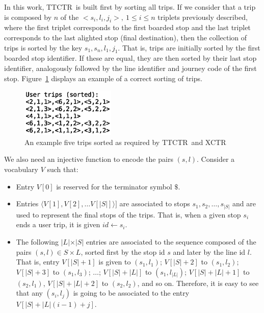 \documentclass[runningheads]{llncs}
\newcommand{\ctr}{XCTR}
\newcommand{\ttctr}{TTCTR}
\begin{document}
In this work, \ttctr~is built first by sorting all trips. If we consider that a trip is composed by $n$ of the $<s_i,l_i,j_i>,~1\leq i\leq n$ triplets previously described, where the first triplet corresponds to the first boarded stop and the last triplet corresponds to the last alighted stop (final destination), then the collection of trips is sorted by the key $s_1,s_n,l_1,j_1$. That is, trips are initially sorted by the first boarded stop identifier. If these are equal, they are then sorted by their last stop identifier, analogously followed by the line identifier and journey code of the first stop. Figure~\ref{fig:example_trips} displays an example of a correct sorting of trips.

\begin{figure}[hbt!]
\includegraphics[width=0.4\textwidth]{example_trips.eps}
\caption{An example five trips sorted as required by \ttctr~and \ctr}
\label{fig:example_trips}
\end{figure}

We also need an injective function to encode the pairs $(s,l)$. Consider a vocabulary $V$ such that:
\begin{itemize}
	\item Entry $V[0]$ is reserved for the terminator symbol $\$$.
	\item Entries $\langle V[1],V[2], \dots V[|S|]\rangle]$ are associated to stops $s_1,s_2,\dots, s_{|S|}$ and are used to represent the final stops of the trips. That is, when a given stop $s_i$ ends a user trip, it is given $id \leftarrow s_i$.
	\item The following $|L|$$\times$$|S|$ entries are associated to the sequence composed of the pairs $(s,l) \in S\times L$, sorted first by the stop id $s$ and later by the line id $l$. That is, entry $V[|S|+1]$ is given to $(s_1,l_1)$; $V[|S|+2]$ to $(s_1,l_2)$; $V[|S|+3]$ to $(s_1,l_3)$; $\dots$; $V[|S|+|L|]$ to $(s_1,l_{|L|})$;  $V[|S|+|L|+1]$ to $(s_2, l_1)$, $V[|S|+|L|+2]$ to $(s_2, l_2)$, and so on. Therefore, it is easy to see that any $(s_i,l_j)$ is going to be associated to the entry $V[|S|+ |L|(i-1) + j]$.
\end{itemize}
\end{document}
